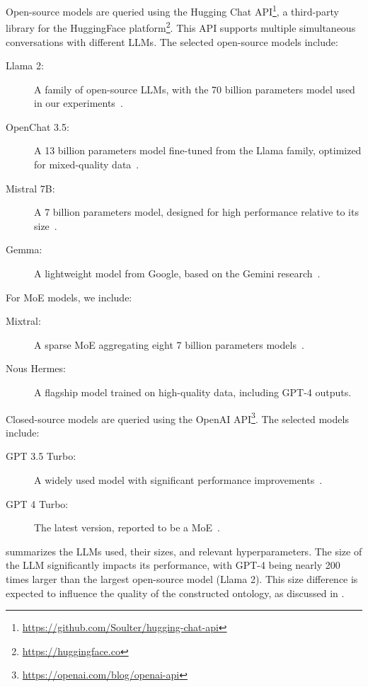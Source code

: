 %
Open-source models are queried using the Hugging Chat API\footnote{\url{https://github.com/Soulter/hugging-chat-api}}, a third-party library for the HuggingFace platform\footnote{\url{https://huggingface.co}}.
%
This API supports multiple simultaneous conversations with different \glspl{LLM}.
%
The selected open-source models include:
%
\begin{description}
    \item[Llama 2:] A family of open-source \glspl{LLM}, with the 70 billion parameters model used in our experiments~\cite{llama2-2023}.
    \item[OpenChat 3.5:] A 13 billion parameters model fine-tuned from the Llama family, optimized for mixed-quality data~\cite{wang2023openchat}.
    \item[Mistral 7B:] A 7 billion parameters model, designed for high performance relative to its size~\cite{mistral}.
    \item[Gemma:] A lightweight model from Google, based on the Gemini research~\cite{gemini}.
\end{description}

%
For \gls{MoE} models, we include:
%
\begin{description}
    \item[Mixtral:] A sparse \gls{MoE} aggregating eight 7 billion parameters models~\cite{mixtral}.
    \item[Nous Hermes:] A flagship model trained on high-quality data, including GPT-4 outputs.
\end{description}

%
Closed-source models are queried using the OpenAI API\footnote{\url{https://openai.com/blog/openai-api}}.
%
The selected models include:
%
\begin{description}
    \item[GPT 3.5 Turbo:] A widely used model with significant performance improvements~\cite{gpt3-2020}.
    \item[GPT 4 Turbo:] The latest version, reported to be a \gls{MoE}~\cite{gpt4}.
\end{description}

%
 summarizes the \glspl{LLM} used, their sizes, and relevant hyperparameters.
%
The size of the \gls{LLM} significantly impacts its performance, with GPT-4 being nearly 200 times larger than the largest open-source model (Llama 2).
%
This size difference is expected to influence the quality of the constructed ontology, as discussed in .

